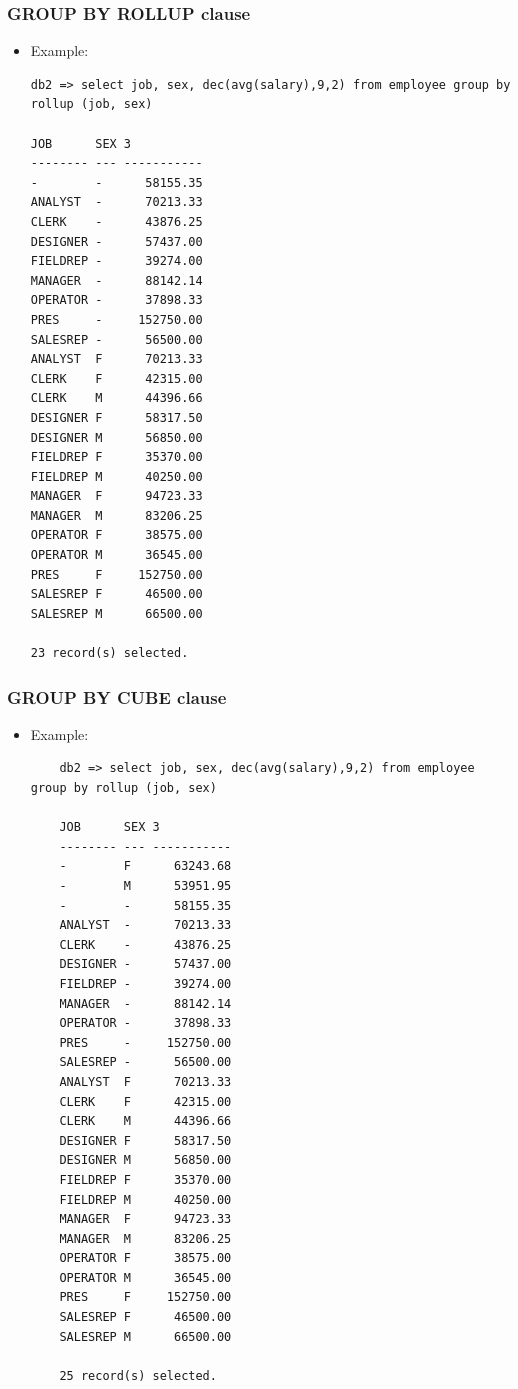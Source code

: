 \documentclass{article}
\begin{document}
\subsubsection*{GROUP BY ROLLUP clause}
\begin{itemize}
\item Example:
\begin{verbatim}
db2 => select job, sex, dec(avg(salary),9,2) from employee group by rollup (job, sex)

JOB      SEX 3
-------- --- -----------
-        -      58155.35
ANALYST  -      70213.33
CLERK    -      43876.25
DESIGNER -      57437.00
FIELDREP -      39274.00
MANAGER  -      88142.14
OPERATOR -      37898.33
PRES     -     152750.00
SALESREP -      56500.00
ANALYST  F      70213.33
CLERK    F      42315.00
CLERK    M      44396.66
DESIGNER F      58317.50
DESIGNER M      56850.00
FIELDREP F      35370.00
FIELDREP M      40250.00
MANAGER  F      94723.33
MANAGER  M      83206.25
OPERATOR F      38575.00
OPERATOR M      36545.00
PRES     F     152750.00
SALESREP F      46500.00
SALESREP M      66500.00

23 record(s) selected.
\end{verbatim}
\end{itemize}

\subsubsection*{GROUP BY CUBE clause}
\begin{itemize}
	\item Example:
	\begin{verbatim}
	db2 => select job, sex, dec(avg(salary),9,2) from employee group by rollup (job, sex)
	
	JOB      SEX 3
	-------- --- -----------
	-        F      63243.68
	-        M      53951.95
	-        -      58155.35
	ANALYST  -      70213.33
	CLERK    -      43876.25
	DESIGNER -      57437.00
	FIELDREP -      39274.00
	MANAGER  -      88142.14
	OPERATOR -      37898.33
	PRES     -     152750.00
	SALESREP -      56500.00
	ANALYST  F      70213.33
	CLERK    F      42315.00
	CLERK    M      44396.66
	DESIGNER F      58317.50
	DESIGNER M      56850.00
	FIELDREP F      35370.00
	FIELDREP M      40250.00
	MANAGER  F      94723.33
	MANAGER  M      83206.25
	OPERATOR F      38575.00
	OPERATOR M      36545.00
	PRES     F     152750.00
	SALESREP F      46500.00
	SALESREP M      66500.00
	
	25 record(s) selected.
	\end{verbatim}
\end{itemize}
\end{document}
